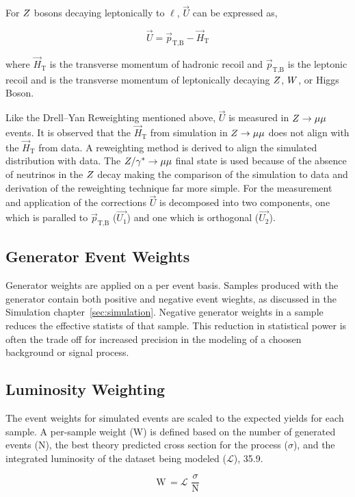 For $Z$ bosons decaying leptonically to $\ell$, $\vec{U}$ can be expressed as,

\begin{equation}
\vec{U} = \vec{p}_{\text{T,B}} - \vec{H}_{\text{T}}
\end{equation}

where $\vec{H}_{\text{T}}$ is the transverse momentum of hadronic recoil and $\vec{p}_{\text{T,B}}$
is the leptonic recoil and is the transverse momentum of leptonically decaying $Z$, $W$, or Higgs Boson.

Like the Drell--Yan Reweighting mentioned above, $\vec{U}$ is measured in $Z\to\mu\mu$ events.
It is observed that the $\vec{H}_{\text{T}}$ from simulation in $Z\to\mu\mu$ does not align with
the $\vec{H}_{\text{T}}$ from data. A reweighting method is derived to align the simulated distribution with 
data. The $Z/\gamma^*\to\mu\mu$
final state is used because of the absence of neutrinos in the $Z$ decay making the comparison of
the simulation to data and derivation of the reweighting technique far more simple. For the measurement
and application of the corrections $\vec{U}$ is decomposed into two components, one which is
paralled to $\vec{p}_{\text{T,B}}$ ($\vec{U_{1}}$) and one which is orthogonal ($\vec{U_{2}}$).


\subsection{Generator Event Weights}
Generator weights are applied on a per event basis. Samples produced with the \aMCATNLO generator
contain both positive and negative event wieghts, as discussed in the Simulation chapter~\ref{sec:simulation}.
Negative generator weights in a sample reduces the effective statists of that sample. This reduction
in statistical power is often the trade off for increased precision in the modeling of a choosen
background or signal process.


\subsection{Luminosity Weighting}
The event weights for simulated events are scaled to the expected yields for each sample. A per-sample
weight (W) is defined based on the number of generated events (N), the best theory predicted cross section
for the process ($\sigma$), and the integrated luminosity of the dataset being modeled 
($\mathcal{L}$), 35.9\fbinv.

\begin{equation}
\text{W} \, = \mathcal{L} \, \,  \frac{\sigma}{\text{N}}
\end{equation}

